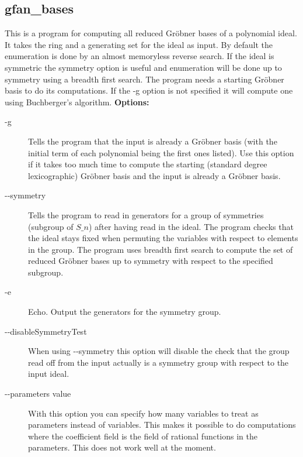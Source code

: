 {\subsection{gfan\_bases}\label{applist:_bases}
This is a program for computing all reduced Gr\"obner bases of a polynomial ideal. It takes the ring and a generating set for the ideal as input. By default the enumeration is done by an almost memoryless reverse search. If the ideal is symmetric the symmetry option is useful and enumeration will be done up to symmetry using a breadth first search. The program needs a starting Gr\"obner basis to do its computations. If the -g option is not specified it will compute one using Buchberger's algorithm.
\newline
{\bf Options:}
\begin{description}
\item[-g]Tells the program that the input is already a Gr\"obner basis (with the initial term of each polynomial being the first ones listed). Use this option if it takes too much time to compute the starting (standard degree lexicographic) Gr\"obner basis and the input is already a Gr\"obner basis.
\item[-\hspace{0.013cm}-symmetry]Tells the program to read in generators for a group of symmetries (subgroup of $S\_n$) after having read in the ideal. The program checks that the ideal stays fixed when permuting the variables with respect to elements in the group. The program uses breadth first search to compute the set of reduced Gr\"obner bases up to symmetry with respect to the specified subgroup.
\item[-e]Echo. Output the generators for the symmetry group.
\item[-\hspace{0.013cm}-disableSymmetryTest]When using -\hspace{0.013cm}-symmetry this option will disable the check that the group read off from the input actually is a symmetry group with respect to the input ideal.
\item[-\hspace{0.013cm}-parameters value]With this option you can specify how many variables to treat as parameters instead of variables. This makes it possible to do computations where the coefficient field is the field of rational functions in the parameters. This does not work well at the moment.\end{description}


}
